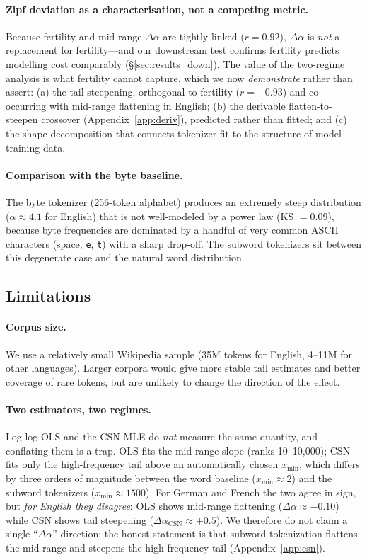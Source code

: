\documentclass{article}
\begin{document}
\paragraph{Zipf deviation as a characterisation, not a competing metric.}
Because fertility and mid-range $\Delta\alpha$ are tightly linked ($r = 0.92$),
$\Delta\alpha$ is \emph{not} a replacement for fertility---and our downstream test
confirms fertility predicts modelling cost comparably (\S\ref{sec:results_down}). The
value of the two-regime analysis is what fertility cannot capture, which we now
\emph{demonstrate} rather than assert: (a) the tail steepening, orthogonal to fertility
($r = -0.93$) and co-occurring with mid-range flattening in English; (b) the derivable
flatten-to-steepen crossover (Appendix~\ref{app:deriv}), predicted rather than fitted;
and (c) the shape decomposition that connects tokenizer fit to the structure of model
training data.

\paragraph{Comparison with the byte baseline.}
The byte tokenizer (256-token alphabet) produces an extremely steep distribution
($\alpha \approx 4.1$ for English) that is not well-modeled by a power law (KS $= 0.09$),
because byte frequencies are dominated by a handful of very common ASCII characters
(space, \texttt{e}, \texttt{t}) with a sharp drop-off. The subword tokenizers sit
between this degenerate case and the natural word distribution.

\subsection{Limitations}
\label{sec:limitations}

\paragraph{Corpus size.} We use a relatively small Wikipedia sample (35M tokens for
English, 4--11M for other languages). Larger corpora would give more stable tail
estimates and better coverage of rare tokens, but are unlikely to change the direction
of the effect.

\paragraph{Two estimators, two regimes.} Log-log OLS and the CSN MLE
\citep{clauset2009} do \emph{not} measure the same quantity, and conflating them is a
trap. OLS fits the mid-range slope (ranks 10--10{,}000); CSN fits only the high-frequency
tail above an automatically chosen $x_{\min}$, which differs by three orders of magnitude
between the word baseline ($x_{\min} \approx 2$) and the subword tokenizers
($x_{\min} \approx 1500$). For German and French the two agree in sign, but \emph{for
English they disagree}: OLS shows mid-range flattening ($\Delta\alpha \approx -0.10$)
while CSN shows tail steepening ($\Delta\alpha_{\text{CSN}} \approx +0.5$). We therefore
do not claim a single ``$\Delta\alpha$'' direction; the honest statement is that subword
tokenization flattens the mid-range and steepens the high-frequency tail
(Appendix~\ref{app:csn}).
\end{document}
